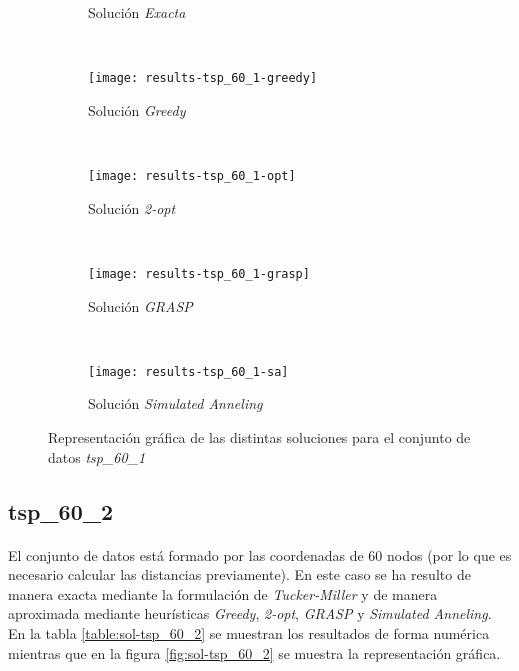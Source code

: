 \documentclass[spanish]{article}
\begin{document}
			\begin{figure}[h]
				\centering
				\begin{subfigure}{.4\textwidth}
					\centering
					\caption{Solución \emph{Exacta}}
				\end{subfigure} \
				\begin{subfigure}{.4\textwidth}
					\centering
					\texttt{[image: results-tsp\_60\_1-greedy]}
					\caption{Solución \emph{Greedy}}
				\end{subfigure} \\
				\begin{subfigure}{.4\textwidth}
					\centering
					\texttt{[image: results-tsp\_60\_1-opt]}
					\caption{Solución \emph{2-opt}}
				\end{subfigure} \
				\begin{subfigure}{.4\textwidth}
					\centering
					\texttt{[image: results-tsp\_60\_1-grasp]}
					\caption{Solución \emph{GRASP}}
				\end{subfigure} \\
				\begin{subfigure}{.4\textwidth}
					\centering
					\texttt{[image: results-tsp\_60\_1-sa]}
					\caption{Solución \emph{Simulated Anneling}}
				\end{subfigure}
				\caption{Representación gráfica de las distintas soluciones para el conjunto de datos \emph{tsp\_60\_1}}
				\label{fig:sol-tsp_60_1}
			\end{figure}


		\subsection{tsp\_60\_2}

			\paragraph{}
			El conjunto de datos está formado por las coordenadas de $60$ nodos (por lo que es necesario calcular las distancias previamente). En este caso se ha resulto de manera exacta mediante la formulación de \emph{Tucker-Miller} y de manera aproximada mediante heurísticas \emph{Greedy}, \emph{2-opt}, \emph{GRASP} y \emph{Simulated Anneling}. En la tabla \ref{table:sol-tsp_60_2} se muestran los resultados de forma numérica mientras que en la figura \ref{fig:sol-tsp_60_2} se muestra la representación gráfica.
\end{document}
